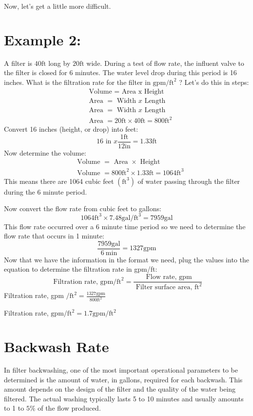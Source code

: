 \documentclass[10pt]{article}
\begin{document}
Now, let's get a little more difficult.

\section{Example 2:}
A filter is $40 \mathrm{ft}$ long by $20 \mathrm{ft}$ wide. During a test of flow rate, the influent valve to the filter is closed for 6 minutes. The water level drop during this period is 16 inches. What is the filtration rate for the filter in $\mathrm{gpm} / \mathrm{ft}^{2}$ ? Let's do this in steps:
$$
\begin{aligned}
&\text { Volume = Area x Height } \\
&\text { Area }=\text { Width } x \text { Length } \\
&\text { Area }=\text { Width } x \text { Length } \\
&\text { Area }=20 \mathrm{ft} \times 40 \mathrm{ft}=800 \mathrm{ft}^{2}
\end{aligned}
$$
Convert 16 inches (height, or drop) into feet:
$$
16 \text { in } x \frac{1 \mathrm{ft}}{12 \mathrm{in}}=1.33 \mathrm{ft}
$$
Now determine the volume:
$$
\begin{aligned}
&\text { Volume }=\text { Area } \times \text { Height } \\
&\text { Volume }=800 \mathrm{ft}^{2} \times 1.33 \mathrm{ft}=1064 \mathrm{ft}^{3}
\end{aligned}
$$
This means there are 1064 cubic feet $\left(\mathrm{ft}^{3}\right)$ of water passing through the filter during the 6 minute period.

Now convert the flow rate from cubic feet to gallons:
$$
1064 \mathrm{ft}^{3} \times 7.48 \mathrm{gal} / \mathrm{ft}^{3}=7959 \mathrm{gal}
$$
This flow rate occurred over a 6 minute time period so we need to determine the flow rate that occurs in 1 minute:
$$
\frac{7959 \mathrm{gal}}{6 \mathrm{~min}}=1327 \mathrm{gpm}
$$
Now that we have the information in the format we need, plug the values into the equation to determine the filtration rate in gpm/ft:
$$
\text { Filtration rate, } \mathrm{gpm} / \mathrm{ft}^{2}=\frac{\text { Flow rate, } \mathrm{gpm}}{\text { Filter surface area, } \mathrm{ft}^{2}}
$$
Filtration rate, gpm $/ \mathrm{ft}^{2}=\frac{1327 \mathrm{gpm}}{800 \mathrm{ft}^{2}}$

Filtration rate, $\mathrm{gpm} / \mathrm{ft}^{2}=1.7 \mathrm{gpm} / \mathrm{ft}^{2}$

\section{Backwash Rate}
In filter backwashing, one of the most important operational parameters to be determined is the amount of water, in gallons, required for each backwash. This amount depends on the design of the filter and the quality of the water being filtered. The actual washing typically lasts 5 to 10 minutes and usually amounts to 1 to $5 \%$ of the flow produced.
\end{document}
